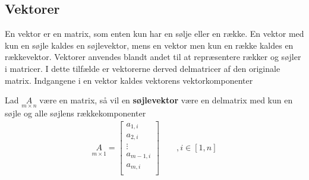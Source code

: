 \subsection{Vektorer}

\begin{comment}
det der stod her originalt
Når vektorer omtales, er der tale om en matrice, der kun har en række, kaldet en række vektor, eller en matrice, med kun en søjle, kaldt en søjle vektor. Disse vektorer kan være for sig selv, eller være en delmatrice af en $\underset{m \times n}{A}$ matrice\\
Disse Vektorers indgange  kaldes vektorkomponenter. %
\end{comment}

En vektor er en matrix, som enten kun har en sølje eller en række. En vektor med kun en søjle kaldes en søjlevektor, mens en vektor men kun en række kaldes en rækkevektor.
Vektorer anvendes blandt andet til at repræsentere  rækker og søjler i matricer. I dette tilfælde er vektorerne derved delmatricer af den originale matrix.
Indgangene i en vektor kaldes vektorens vektorkomponenter



\begin{defn}[Søjlevektor]
Lad $\underset{m \times n}{A}$ være en matrix, så vil en \textbf{søjlevektor} være en delmatrix med kun en søjle og alle søjlens rækkekomponenter
\begin{align*}
\underset{m \times 1}{A} = 
\begin{bmatrix}
a_{1,i}\\
a_{2,i}\\
\vdots \\
a_{m-1,i}\\
a_{m,i} \\
\end{bmatrix}\qquad , i\in [1,n]%
\end{align*}
\end{defn}

